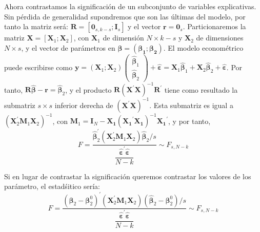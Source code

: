 Ahora contrastamos la significaci\'on de un subconjunto de variables
explicativas. Sin p\'erdida de generalidad supondremos que son las \'ultimas
del modelo, por tanto la matriz ser\'a: $\boldsymbol{R}=\left[\boldsymbol{0}_{s,k-s};\boldsymbol{I}_{s}\right]$
y el vector $\boldsymbol{r}=\boldsymbol{0}_{s}$. Particionaremos
la matriz $\boldsymbol{X}=\left[\boldsymbol{X}_{1};\boldsymbol{X}_{2}\right]$,
con $\boldsymbol{X}_{1}$ de dimensi\'on $N\times k-s$ y $\boldsymbol{X}_{2}$
de dimensiones $N\times s$, y el vector de par\'ametros en $\boldsymbol{\beta}=\left(\mathbf{\boldsymbol{\beta}_{1};\boldsymbol{\beta}_{2}}\right)$.
El modelo econom\'etrico puede escribirse como $\boldsymbol{y}=\left(\boldsymbol{X}_{1};\boldsymbol{X}_{2}\right)\left(\begin{array}{c}
\hat{\boldsymbol{\boldsymbol{\beta}}}_{1}\\
\boldsymbol{\hat{\boldsymbol{\beta}}}_{2}
\end{array}\right)+\hat{\boldsymbol{\varepsilon}}=\boldsymbol{X}_{1}\hat{\boldsymbol{\boldsymbol{\beta}}}_{1}+\boldsymbol{X}_{2}\boldsymbol{\hat{\boldsymbol{\beta}}}_{2}+\hat{\boldsymbol{\varepsilon}}$. Por tanto, $\boldsymbol{R}\hat{\boldsymbol{\beta}}-\boldsymbol{r}=\boldsymbol{\hat{\boldsymbol{\beta}}}_{2}$,
y el producto $\boldsymbol{R}\left(\boldsymbol{X}^{\prime}\boldsymbol{X}\right)^{-1}\boldsymbol{R}^{\prime}$
tiene como resultado la submatriz $s\times s$ inferior derecha de
$\left(\boldsymbol{X}^{\prime}\boldsymbol{X}\right)^{-1}$. Esta submatriz
es igual a $\left(\boldsymbol{X}^{\prime}_{2}\boldsymbol{M}_{1}\boldsymbol{X}_{2}\right)^{-1}$,
con $\boldsymbol{M}_{1}=\boldsymbol{I}_{N}-\boldsymbol{X_{1}}\left(\boldsymbol{X_{1}}^{\prime}\boldsymbol{X_{1}}\right)^{-1}\boldsymbol{X_{1}}^{\prime}$,
y por tanto, 
\begin{equation*}
F=\dfrac{\hat{\boldsymbol{\beta}}^{\prime}_{2}\left(\boldsymbol{X}^{\prime}_{2}\boldsymbol{M}_{1}\boldsymbol{X}_{2}\right)\hat{\boldsymbol{\beta}}_{2}/s}{\dfrac{\hat{\boldsymbol{\varepsilon}}^{\prime}\hat{\boldsymbol{\varepsilon}}}{N-k}}\sim F_{s,N-k}
\end{equation*}


Si en lugar de contrastar la significaci\'on queremos contrastar los
valores de los par\'ametro, el estad\'{s}itico ser\'ia:
\begin{equation*}
F=\dfrac{\left(\hat{\boldsymbol{\beta}}_{2}-\boldsymbol{\beta}_{2}^{0}\right)^{\prime}\left(\boldsymbol{X}^{\prime}_{2}\boldsymbol{M}_{1}\boldsymbol{X}_{2}\right)\left(\hat{\boldsymbol{\beta}}_{2}-\boldsymbol{\beta}_{2}^{0}\right)/s}{\dfrac{\hat{\boldsymbol{\varepsilon}}^{\prime}\hat{\boldsymbol{\varepsilon}}}{N-k}}\sim F_{s,N-k}
\end{equation*}

